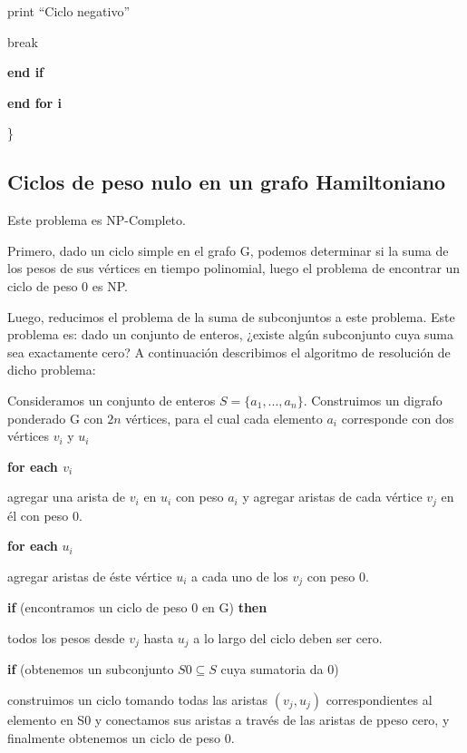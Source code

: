 \documentclass[a4paper,10pt]{article}
\begin{document}
\quad \quad \quad print “Ciclo negativo”
		
\quad \quad \quad break
		
\quad \quad \textbf{\textcolor[rgb]{0.0,0.5019608,0.0}{end if}}
	
\quad \textbf{\textcolor[rgb]{0.0,0.5019608,0.0}{end for i}}

\}


\subsection{Ciclos de peso nulo en un grafo Hamiltoniano}

Este problema es NP-Completo.
 
Primero, dado un ciclo simple en el grafo G, podemos determinar si la suma de los pesos de sus vértices en tiempo polinomial, luego el problema de encontrar un ciclo de peso 0 es NP.

Luego, reducimos el problema de la suma de subconjuntos a este problema. Este problema es: dado un conjunto de enteros, ¿existe algún subconjunto cuya suma sea exactamente cero? A continuación describimos el algoritmo de resolución de dicho problema:

\bigskip

Consideramos un conjunto de enteros \( S = \{ a_{1}, . . . , a_{n} \}  \). Construimos un digrafo ponderado G con \( 2n \) vértices, para el cual cada elemento \( a_{i} \) corresponde con dos vértices \( v_{i} \) y \( u_{i} \)

\textbf{\textcolor[rgb]{0.0,0.5019608,0.0}{for each }}\( v_{i} \)

\quad agregar una arista de \( v_{i} \) en \( u_{i} \) con peso \( a_{i} \) y agregar aristas de cada vértice \( v_{j} \) en él con peso 0.

\textbf{\textcolor[rgb]{0.0,0.5019608,0.0}{for each}} \( u_{i} \)

\quad agregar aristas de éste vértice \( u_{i} \) a cada uno de los \( v_{j} \) con peso 0. 

\textbf{\textcolor[rgb]{0.0,0.5019608,0.0}{if}} (encontramos un ciclo de peso 0 en G) \textbf{\textcolor[rgb]{0.0,0.5019608,0.0}{then}}

\quad todos los pesos desde \( v_{j} \) hasta \( u_{j} \) a lo largo del ciclo deben ser cero.
		
\textbf{\textcolor[rgb]{0.0,0.5019608,0.0}{if}} (obtenemos un subconjunto \( S0 \subseteq S \) cuya sumatoria da 0)

\quad construimos un ciclo tomando todas las aristas \( (v_{j}, u_{j}) \) correspondientes al elemento en S0 y conectamos sus aristas a través de las aristas de ppeso cero, y finalmente obtenemos un ciclo de peso 0.
\end{document}
